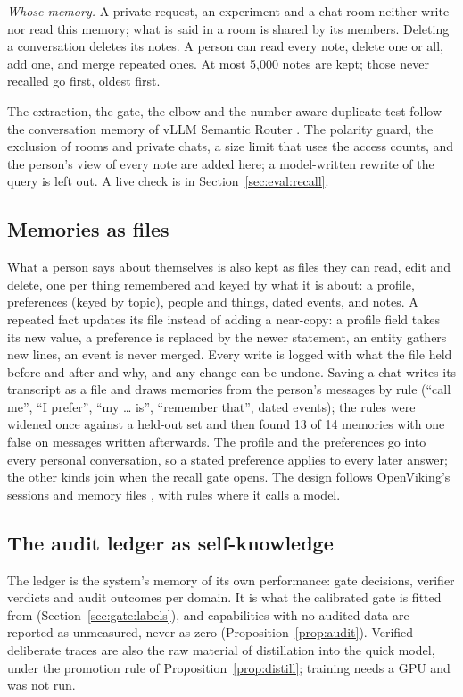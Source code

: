 \emph{Whose memory.} A private request, an experiment and a chat room neither
write nor read this memory; what is said in a room is shared by its members.
Deleting a conversation deletes its notes. A person can read every note,
delete one or all, add one, and merge repeated ones. At most 5{,}000 notes
are kept; those never recalled go first, oldest first.

The extraction, the gate, the elbow and the number-aware duplicate test follow
the conversation memory of vLLM Semantic Router \cite{semanticrouter2026}.
The polarity guard, the exclusion of rooms and private chats, a size limit
that uses the access counts, and the person's view of every note are added
here; a model-written rewrite of the query is left out. A live check is in
Section~\ref{sec:eval:recall}.

\subsection{Memories as files}
\label{sec:mem:files}
What a person says about themselves is also kept as files they can read,
edit and delete, one per thing remembered and keyed by what it is about: a
profile, preferences (keyed by topic), people and things, dated events, and
notes. A repeated fact updates its file instead of adding a near-copy: a
profile field takes its new value, a preference is replaced by the newer
statement, an entity gathers new lines, an event is never merged. Every
write is logged with what the file held before and after and why, and any
change can be undone. Saving a chat writes its transcript as a file and
draws memories from the person's messages by rule (``call me'', ``I
prefer'', ``my \ldots{} is'', ``remember that'', dated events); the rules
were widened once against a held-out set and then found 13 of 14 memories
with one false on messages written afterwards. The profile and the
preferences go into every personal conversation, so a stated preference
applies to every later answer; the other kinds join when the recall gate
opens. The design follows OpenViking's sessions and memory files
\cite{openviking2026}, with rules where it calls a model.



\subsection{The audit ledger as self-knowledge}
\label{sec:mem:ledger}
The ledger is the system's memory of its own performance: gate decisions,
verifier verdicts and audit outcomes per domain. It is what the calibrated
gate is fitted from (Section~\ref{sec:gate:labels}), and capabilities with no
audited data are reported as unmeasured, never as zero
(Proposition~\ref{prop:audit}). Verified deliberate traces are also the raw
material of distillation into the quick model, under the promotion rule of
Proposition~\ref{prop:distill}; training needs a GPU and was not run.

